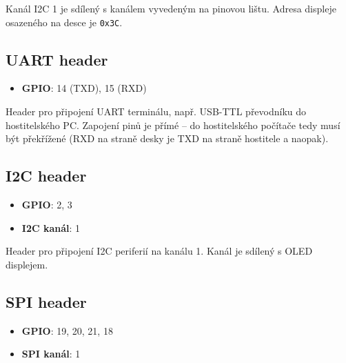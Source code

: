 \documentclass{article}
\newcommand\lang[2]{#1}
\begin{document}
\noindent
\lang{Kanál I2C 1 je sdílený s kanálem vyvedeným na pinovou lištu. Adresa displeje osazeného na desce je \texttt{0x3C}.}{The I2C channel 1 is shared with the pin header mounted on board. The address of the display on the board is \texttt{0x3C}.}

\subsection{UART header}

\begin{itemize}[nosep]
	\item \textbf{GPIO}: 14 (TXD), 15 (RXD)
\end{itemize}

\vspace{1em}

\noindent
\lang{Header pro připojení UART terminálu, např. USB-TTL převodníku do hostitelského PC. Zapojení pinů je přímé -- do hostitelského počítače tedy musí být překřížené (RXD na straně desky je TXD na straně hostitele a naopak).}
{Header for UART terminal connection, e.g. the USB-TTL converter to host PC. The wiring is direct -- wiring should be crossed over to the other end (RXD on the board side to the TXD on the host side and vice versa).}

\subsection{I2C header}

\begin{itemize}[nosep]
	\item \textbf{GPIO}: 2, 3
    \item \textbf{\lang{I2C kanál}{I2C channel}}: 1
\end{itemize}

\vspace{1em}

\noindent
\lang{Header pro připojení I2C periferií na kanálu 1. Kanál je sdílený s OLED displejem.}
{Header for connecting I2C peripherals on channel 1. The channel is shared with the OLED display.}

\subsection{SPI header}

\begin{itemize}[nosep]
	\item \textbf{GPIO}: 19, 20, 21, 18
    \item \textbf{\lang{SPI kanál}{SPI channel}}: 1
\end{itemize}
\end{document}
